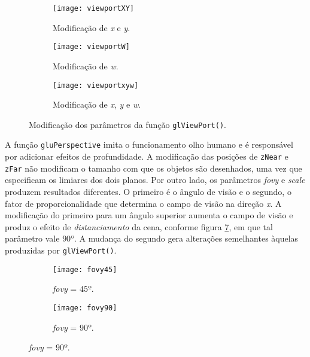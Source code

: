 \documentclass[12pt, a4paper]{article}
\begin{document}
\begin {enumerate}
\FloatBarrier

\begin{figure}[h!]

\centering

\begin{subfigure}{.33\textwidth}
\centering
\texttt{[image: viewportXY]}
\caption{\centering Modificação de \textit{x} e \textit{y}.}
\label{img:xy}
\end{subfigure}%
\begin{subfigure}{.33\textwidth}
\centering
\texttt{[image: viewportW]}
\caption{\centering Modificação de \textit{w}.}
\label{img:w}
\end{subfigure}
\begin{subfigure}{.33\textwidth}
\centering
\texttt{[image: viewportxyw]}
\caption{\centering Modificação de \textit{x}, \textit{y} e \textit{w}.}
\label{img:xyw}
\end{subfigure}


\caption{Modificação dos parâmetros da função \texttt{glViewPort()}.}
\end{figure}

\FloatBarrier

A função \texttt{gluPerspective} imita o funcionamento olho humano e é
responsável por adicionar efeitos de profundidade. A modificação das posições
de \texttt{zNear} e \texttt{zFar} não modificam o tamanho com que os objetos são
desenhados, uma vez que especificam os limiares dos dois planos. Por outro
lado, os parâmetros \textit{fovy} e \textit{scale} produzem resultados
diferentes. O primeiro é o ângulo de visão e o segundo, o fator de
proporcionalidade que determina o campo de visão na direção \textit{x}. A
modificação do primeiro para um ângulo superior aumenta o campo de visão e
produz o efeito de \textit{distanciamento} da cena, conforme figura
\ref{img:fovy90}, em que tal parâmetro vale \(90º\). A mudança do segundo gera
alterações semelhantes àquelas produzidas por \texttt{glViewPort()}.

\FloatBarrier

\begin{figure}[h!]

\centering

\begin{subfigure}{.33\textwidth}
\centering
\texttt{[image: fovy45]}
\caption{\centering \textit{fovy} = \(45º\).}
\label{img:fovy45}
\end{subfigure}%
\begin{subfigure}{.33\textwidth}
\centering
\texttt{[image: fovy90]}
\caption{\centering \textit{fovy} = \(90º\).}
\label{img:fovy90}
\end{subfigure}


\end{figure}
\end{enumerate}
\end{document}
